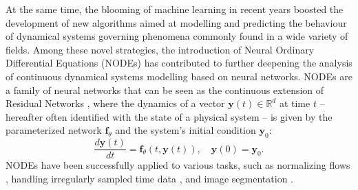 \documentclass[pmlr]{jmlr}%
\begin{document}
At the same time, the blooming of machine learning in recent years boosted the development of new algorithms aimed at modelling and predicting the behaviour of dynamical systems governing phenomena commonly found in a wide variety of fields. Among these novel strategies, the introduction of Neural Ordinary Differential Equations (NODEs) \citep{node} has contributed to further deepening the analysis of continuous dynamical systems modelling based on neural networks. NODEs are a family of neural networks that can be seen as the continuous extension of Residual Networks \citep{resnet}, where the dynamics of a vector $\mathbf{y}(t) \in \mathbb{R}^d$ at time $t$ -- hereafter often identified with the state of a physical system -- is given by the parameterized network $\mathbf{f}_{\theta}$ and the system's initial condition $\mathbf{y}_0$:
%
\begin{equation}
\frac{d \mathbf{y}(t)}{dt} = \mathbf{f}_{\theta}(t, \mathbf{y}(t)), \quad \mathbf{y}(0) = \mathbf{y}_0.
\end{equation}
%
NODEs have been successfully applied to various tasks, such as normalizing flows \citep{node_easy_to_solve,free_nf}, handling irregularly sampled time data \citep{latent_ode,kidger_irregular}, and image segmentation \citep{node_image_segmentation}.
\\
\end{document}
